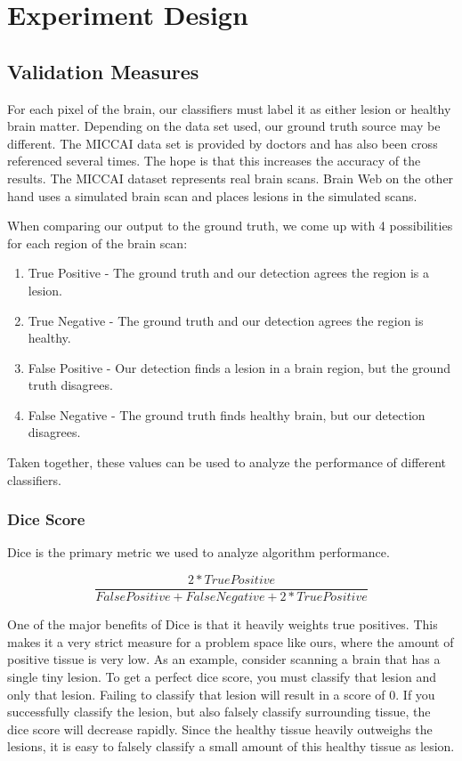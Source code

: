 \documentclass{article} %
\begin{document}
\section{Experiment Design}

\subsection{Validation Measures}
For each pixel of the brain, our classifiers must label it as either lesion or healthy brain matter. Depending on the data set used, our ground truth source may be different. The MICCAI data set is provided by doctors and has also been cross referenced several times. The hope is that this increases the accuracy of the results. The MICCAI dataset represents real brain scans. Brain Web on the other hand uses a simulated brain scan and places lesions in the simulated scans.

When comparing our output to the ground truth, we come up with 4 possibilities for each region of the brain scan:
\begin{enumerate}
  \item True Positive - The ground truth and our detection agrees the region is a lesion.
  \item True Negative - The ground truth and our detection agrees the region is healthy.
  \item False Positive - Our detection finds a lesion in a brain region, but the ground truth disagrees.
  \item False Negative - The ground truth finds healthy brain, but our detection disagrees.
\end{enumerate} 
Taken together, these values can be used to analyze the performance of different classifiers. 
\subsubsection{Dice Score}
Dice is the primary metric we used to analyze algorithm performance. 

$$\frac{2*True Positive}{False Positive + False Negative + 2*True Positive}$$

One of the major benefits of Dice is that it heavily weights true positives. This makes it a very strict measure for a problem space like ours, where the amount of positive tissue is very low. As an example, consider scanning a brain that has a single tiny lesion. To get a perfect dice score, you must classify that lesion and only that lesion. Failing to classify that lesion will result in a score of 0. If you successfully classify the lesion, but also falsely classify surrounding tissue, the dice score will decrease rapidly. Since the healthy tissue heavily outweighs the lesions, it is easy to falsely classify a small amount of this healthy tissue as lesion.
\end{document}
